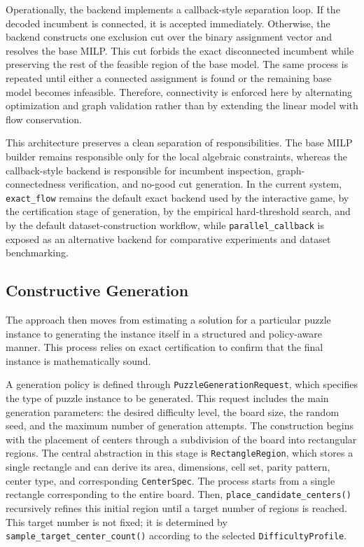 Operationally, the backend implements a callback-style separation loop. If the
decoded incumbent is connected, it is accepted immediately. Otherwise, the
backend constructs one exclusion cut over the binary assignment vector and
resolves the base MILP. This cut forbids the exact disconnected incumbent while
preserving the rest of the feasible region of the base model. The same process
is repeated until either a connected assignment is found or the remaining base
model becomes infeasible. Therefore, connectivity is enforced here by
alternating optimization and graph validation rather than by extending the
linear model with flow conservation.

This architecture preserves a clean separation of responsibilities. The base
MILP builder remains responsible only for the local algebraic constraints,
whereas the callback-style backend is responsible for incumbent inspection,
graph-connectedness verification, and no-good cut generation. In the current
system, \texttt{exact\_flow} remains the default exact backend used by the
interactive game, by the certification stage of generation, by the empirical
hard-threshold search, and by the default dataset-construction workflow, while
\texttt{parallel\_callback} is exposed as an alternative backend for
comparative experiments and dataset benchmarking.

\subsection{Constructive Generation}
The approach then moves from estimating a solution for a particular puzzle instance to generating the instance itself in a structured and policy-aware manner. This process relies on exact certification to confirm that the final instance is mathematically sound.

A generation policy is defined through \texttt{PuzzleGenerationRequest}, which specifies the type of puzzle instance to be generated. This request includes the main generation parameters: the desired difficulty level, the board size, the random seed, and the maximum number of generation attempts. The construction begins with the placement of centers through a subdivision of the board into rectangular regions. The central abstraction in this stage is \texttt{RectangleRegion}, which stores a single rectangle and can derive its area, dimensions, cell set, parity pattern, center type, and corresponding \texttt{CenterSpec}. The process starts from a single rectangle corresponding to the entire board. Then, \texttt{place\_candidate\_centers()} recursively refines this initial region until a target number of regions is reached. This target number is not fixed; it is determined by \texttt{sample\_target\_center\_count()} according to the selected \texttt{DifficultyProfile}.

